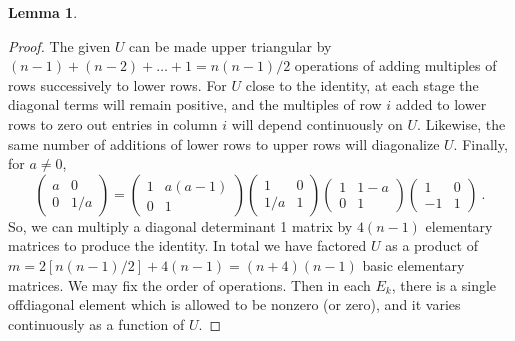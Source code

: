 \documentclass{amsart}
\newtheorem{lemma}[theorem]{Lemma}
\theoremstyle{definition}
\theoremstyle{remark}
\numberwithin{equation}{section}
\begin{document}
{{\begin{lemma}
\end{lemma} 

\begin{proof} 
The given $U$ can be made upper triangular by 
$(n-1) + (n-2) + \dots +1=n(n-1)/2$ operations of 
adding multiples of rows successively to lower rows. For $U$ close to the identity, 
at each stage the diagonal terms will remain positive, and the multiples 
of row $i$ added to lower rows to zero out entries in column $i$ will depend 
continuously on $U$. Likewise, 
the same number of additions of 
lower rows to upper rows will diagonalize $U$.
  Finally, for $a\neq 0$, 
\[ 
\begin{pmatrix} 
a & 0 \\ 0 & 1/a 
\end{pmatrix} 
= 
\begin{pmatrix} 
1 & a(a-1)\\ 0 & 1 
\end{pmatrix} 
\begin{pmatrix} 
1 & 0 \\ 1/a & 1 
\end{pmatrix} 
\begin{pmatrix} 
1 & 1-a \\ 0 & 1
\end{pmatrix} 
\begin{pmatrix} 
1 & 0 \\ -1 & 1
\end{pmatrix} \ . 
\] 
So, we can  multiply a diagonal 
determinant 1 matrix by  
$4(n-1)$ elementary matrices 
to produce the identity. In total we have factored $U$ 
as a product of  $m=2[n(n-1)/2] + 4(n-1) = (n+4)(n-1) $ 
basic elementary matrices. We may fix the order of operations.  
 Then in each  
$E_k$, there is a single offdiagonal element which is allowed 
to be nonzero (or zero), and it varies continuously as a 
function of $U$. 
\end{proof} 

}}
\end{document}

